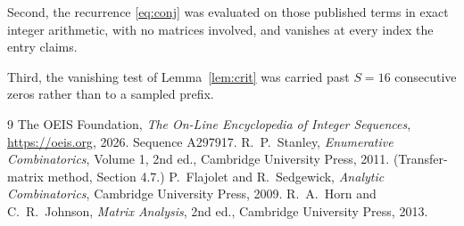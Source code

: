 \documentclass[11pt,a4paper]{article}
\theoremstyle{plain}
\theoremstyle{definition}
\begin{document}
Second, the recurrence \eqref{eq:conj} was evaluated on those published terms in exact
integer arithmetic, with no matrices involved, and vanishes at every index the entry claims.

Third, the vanishing test of Lemma~\ref{lem:crit} was carried past $S=16$ consecutive
zeros rather than to a sampled prefix.

\begin{thebibliography}{9}
 The OEIS Foundation, \emph{The On-Line Encyclopedia of Integer
Sequences}, \url{https://oeis.org}, 2026. Sequence A297917.
 R.~P.~Stanley, \emph{Enumerative Combinatorics}, Volume 1, 2nd ed.,
Cambridge University Press, 2011. (Transfer-matrix method, Section 4.7.)
 P.~Flajolet and R.~Sedgewick, \emph{Analytic Combinatorics}, Cambridge
University Press, 2009.
 R.~A.~Horn and C.~R.~Johnson, \emph{Matrix Analysis}, 2nd ed., Cambridge
University Press, 2013.
\end{thebibliography}
\end{document}
